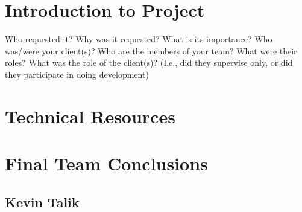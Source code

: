 \documentclass[onecolumn, draftclsnofoot,10pt, compsoc]{IEEEtran}
\begin{document}
\section{Introduction to Project}
Who requested it?
Why was it requested?
What is its importance?
Who was/were your client(s)?
Who are the members of your team?
What were their roles?
What was the role of the client(s)? (I.e., did they supervise only, or did they participate in doing development)





















\section{Technical Resources}

\pagebreak
\section{Final Team Conclusions}
\subsection{Kevin Talik}
\end{document}
